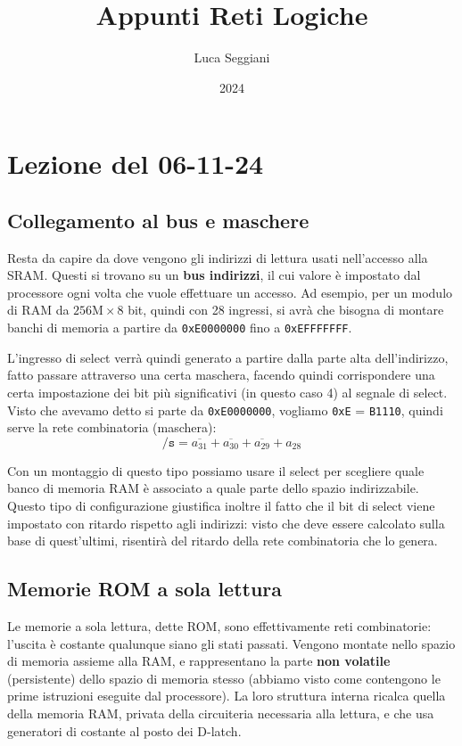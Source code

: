 \documentclass[a4paper,11pt]{article}
\title{Appunti Reti Logiche}
\author{Luca Seggiani}
\date{2024}
\begin{document}
\section{Lezione del 06-11-24}

\thispagestyle{empty}
\pagestyle{fancy}

\subsection{Collegamento al bus e maschere}
Resta da capire da dove vengono gli indirizzi di lettura usati nell'accesso alla SRAM.
Questi si trovano su un \textbf{bus indirizzi}, il cui valore è impostato dal processore ogni volta che vuole effettuare un accesso.
Ad esempio, per un modulo di RAM da $256 \text{M} \times 8$ bit, quindi con 28 ingressi, si avrà che bisogna di montare banchi di memoria a partire da \lstinline|0xE0000000| fino a \lstinline|0xEFFFFFFF|.

L'ingresso di select verrà quindi generato a partire dalla parte alta dell'indirizzo, fatto passare attraverso una certa maschera, facendo quindi corrispondere una certa impostazione dei bit più significativi (in questo caso 4) al segnale di select.
Visto che avevamo detto si parte da \lstinline|0xE0000000|, vogliamo \lstinline|0xE| = \lstinline|B1110|, quindi serve la rete combinatoria (maschera):
$$
\mathtt{/s} = \overline{a_{31}} + \overline{a_{30}} + \overline{a_{29}} + a_{28}
$$

Con un montaggio di questo tipo possiamo usare il select per scegliere quale banco di memoria RAM è associato a quale parte dello spazio indirizzabile.
Questo tipo di configurazione giustifica inoltre il fatto che il bit di select viene impostato con ritardo rispetto agli indirizzi: visto che deve essere calcolato sulla base di quest'ultimi, risentirà del ritardo della rete combinatoria che lo genera.

\subsection{Memorie ROM a sola lettura}
Le memorie a sola lettura, dette ROM, sono effettivamente reti combinatorie: l'uscita è costante qualunque siano gli stati passati.
Vengono montate nello spazio di memoria assieme alla RAM, e rappresentano la parte \textbf{non volatile} (persistente) dello spazio di memoria stesso (abbiamo visto come contengono le prime istruzioni eseguite dal processore).
La loro struttura interna ricalca quella della memoria RAM, privata della circuiteria necessaria alla lettura, e che usa generatori di costante al posto dei D-latch.
\end{document}
